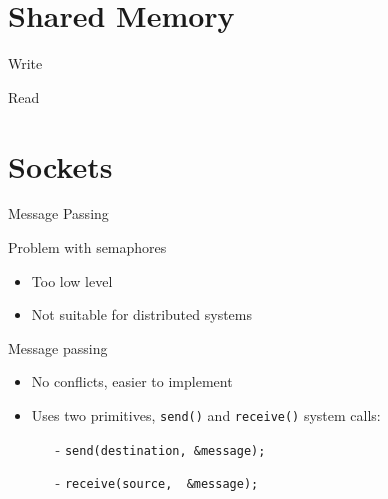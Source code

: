 \section{Shared Memory}
\label{sec:shared-memory}

\begin{frame}{Write}
\begin{center}
\end{center}
\end{frame}

\begin{frame}{Read}
\begin{center}
\end{center}
\end{frame}

\section{Sockets}
\label{sec:sockets}

\begin{frame}{Message Passing}
  \begin{block}{Problem with semaphores}
    \begin{itemize}
    \item Too low level
    \item Not suitable for distributed systems
    \end{itemize}
  \end{block}
  \begin{block}{Message passing}
    \begin{itemize}
    \item No conflicts, easier to implement
    \item Uses two primitives, \texttt{send()} and \texttt{receive()} system calls:
      \begin{itemize}
      \item[-] \texttt{send(destination,\ \&message);}
      \item[-] \texttt{receive(source, \ \&message);}
      \end{itemize}
    \end{itemize}
  \end{block}
\end{frame}

